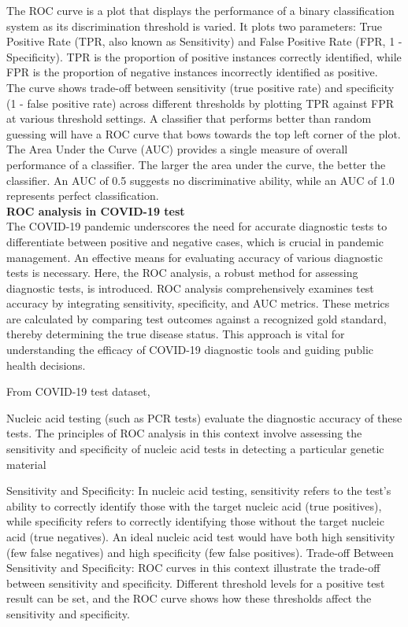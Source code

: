 \documentclass{article}\usepackage[]{graphicx}\usepackage[]{xcolor}
\numberwithin{equation}{section}
\begin{document}
\noindent The ROC curve is a plot that displays the performance of a binary classification system as its discrimination threshold is varied. It plots two parameters: True Positive Rate (TPR, also known as Sensitivity) and False Positive Rate (FPR, 1 - Specificity). TPR is the proportion of positive instances correctly identified, while FPR is the proportion of negative instances incorrectly identified as positive.\\

\noindent The curve shows trade-off between sensitivity (true positive rate) and specificity (1 - false positive rate) across different thresholds by plotting TPR against FPR at various threshold settings. A classifier that performs better than random guessing will have a ROC curve that bows towards the top left corner of the plot.\\

\noindent The Area Under the Curve (AUC) provides a single measure of overall performance of a classifier. The larger the area under the curve, the better the classifier. An AUC of 0.5 suggests no discriminative ability, while an AUC of 1.0 represents perfect classification.\\


\noindent \textbf{ROC analysis in COVID-19 test}\\

\noindent The COVID-19 pandemic underscores the need for accurate diagnostic tests to differentiate between positive and negative cases, which is crucial in pandemic management. An effective means for evaluating accuracy of various diagnostic tests is necessary. Here, the ROC analysis, a robust method for assessing diagnostic tests, is introduced. ROC analysis comprehensively examines test accuracy by integrating sensitivity, specificity, and AUC metrics. These metrics are calculated by comparing test outcomes against a recognized gold standard, thereby determining the true disease status. This approach is vital for understanding the efficacy of COVID-19 diagnostic tools and guiding public health decisions.



From COVID-19 test dataset, 

Nucleic acid testing (such as PCR tests)
evaluate the diagnostic accuracy of these tests. The principles of ROC analysis in this context involve assessing the sensitivity and specificity of nucleic acid tests in detecting a particular genetic material

Sensitivity and Specificity: In nucleic acid testing, sensitivity refers to the test's ability to correctly identify those with the target nucleic acid (true positives), while specificity refers to correctly identifying those without the target nucleic acid (true negatives). An ideal nucleic acid test would have both high sensitivity (few false negatives) and high specificity (few false positives).
 Trade-off Between Sensitivity and Specificity: ROC curves in this context illustrate the trade-off between sensitivity and specificity. Different threshold levels for a positive test result can be set, and the ROC curve shows how these thresholds affect the sensitivity and specificity.
\end{document}
